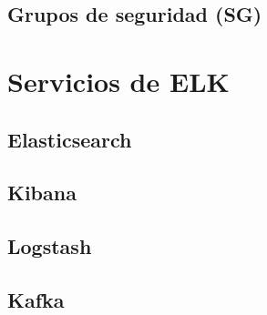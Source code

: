 \subsection{Grupos de seguridad (SG)}


\newpage{}
\section{Servicios de ELK}
\subsection{Elasticsearch}

\newpage{}
\subsection{Kibana}

\newpage{}
\subsection{Logstash}

\newpage{}
\subsection{Kafka}

